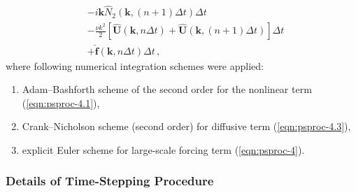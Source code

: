 \documentclass{pracamgren}
\begin{document}
\begin{enumerate}
\begin{align}
&- i \mathbf{k} \hat{N}_2 (\mathbf{k}, (n+1) \Delta t) \Delta t \label{eqn:psproc-4.2} \\
&- \frac{\nu k^2}{2} \left[ \mathbf{\hat{U}}(\mathbf{k}, n \Delta t) + \mathbf{\hat{U}}(\mathbf{k}, (n+1) \Delta t) \right] \Delta t \label{eqn:psproc-4.3} \\
&+ \mathbf{\hat{f}}(\mathbf{k}, n \Delta t) \Delta t \, ,
\label{eqn:psproc-4}
\end{align}
where following numerical integration schemes were applied: 
\begin{enumerate}
\item Adam--Bashforth scheme of the second order for the nonlinear term (\ref{eqn:psproc-4.1}),
\item Crank--Nicholson scheme (second order) for diffusive term (\ref{eqn:psproc-4.3}),
\item explicit Euler scheme for large-scale forcing term (\ref{eqn:psproc-4}).
\end{enumerate}
\end{enumerate}

\subsubsection{Details of Time-Stepping Procedure}
\end{document}
